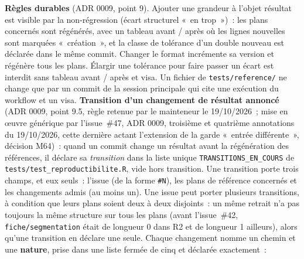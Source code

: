 \documentclass[a4paper,11pt]{article}
\newcommand{\code}[1]{\texttt{\small #1}}
\begin{document}
\noindent
\textbf{Règles durables} (ADR 0009, point 9). Ajouter une grandeur à l'objet
résultat est visible par la non-régression (écart structurel «~en trop~»)~:
les plans concernés sont régénérés, avec un tableau avant / après où les
lignes nouvelles sont marquées «~création~», et la classe de tolérance d'un
double nouveau est déclarée dans le même commit. Changer le format incrémente
sa version et régénère tous les plans. Élargir une tolérance pour faire
passer un écart est interdit sans tableau avant / après et visa. Un fichier de
\code{tests/reference/} ne change que par un commit de la session principale
qui cite une exécution du workflow et un visa. \textbf{Transition d'un
changement de résultat annoncé} (ADR 0009, point 9.5, règle retenue par le
mainteneur le 19/10/2026~; mise en œuvre générique par l'issue~\#47, ADR
0009, troisième et quatrième annotations du 19/10/2026, cette dernière
actant l'extension de la garde «~entrée différente~», décision M64)~: quand
un commit change un résultat avant la régénération des références, il
déclare sa \emph{transition} dans la liste unique
\code{TRANSITIONS\_EN\_COURS} de \code{tests/test\_reproductibilite.R},
vide hors transition. Une transition porte trois champs, et eux seuls~:
l'issue (de la forme \code{\#N}), les plans de référence concernés et les
changements admis (au moins un). Une issue peut porter plusieurs
transitions, à condition que leurs plans soient deux à deux disjoints~: un
même retrait n'a pas toujours la même structure sur tous les plans (avant
l'issue~\#42, \code{fiche/segmentation} était de longueur 0 dans R2 et de
longueur 1 ailleurs), alors qu'une transition en déclare une seule. Chaque
changement nomme un chemin et une \textbf{nature}, prise dans une liste
fermée de cinq et déclarée exactement~:
\end{document}
